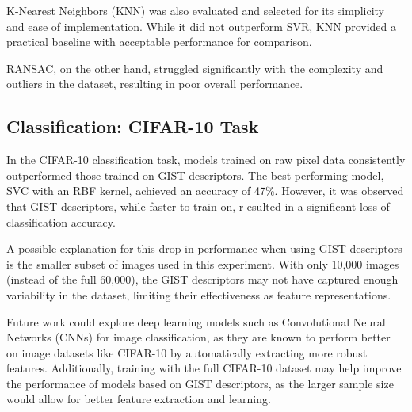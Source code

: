 \documentclass[twocolumn]{article}
\begin{document}
K-Nearest Neighbors (KNN) was also evaluated and selected 
for its simplicity and ease of implementation. While it did not outperform SVR, 
KNN provided a practical baseline with acceptable performance for comparison.

RANSAC, on the other hand, struggled significantly with the complexity and outliers in the dataset, 
resulting in poor overall performance.

  \subsection{Classification: CIFAR-10 Task}
  In the CIFAR-10 classification task, 
  models trained on raw pixel data consistently outperformed those trained on GIST descriptors. 
  The best-performing model, SVC with an RBF kernel, achieved an accuracy of 47\%.
   However, it was observed that GIST descriptors, while faster to train on, r
   esulted in a significant loss of classification accuracy.
  
  A possible explanation for this drop in performance 
  when using GIST descriptors is the smaller subset of images used in this experiment. 
  With only 10,000 images (instead of the full 60,000), the GIST descriptors may not 
  have captured enough variability in the dataset, limiting their effectiveness as feature representations.
  
  Future work could explore deep learning models such as 
  Convolutional Neural Networks (CNNs) for image classification, 
  as they are known to perform better on image datasets like CIFAR-10 by 
  automatically extracting more robust features. Additionally, training with 
  the full CIFAR-10 dataset may help improve the performance of models based on GIST 
  descriptors, as the larger sample size would allow for better feature extraction and learning.
\end{document}
